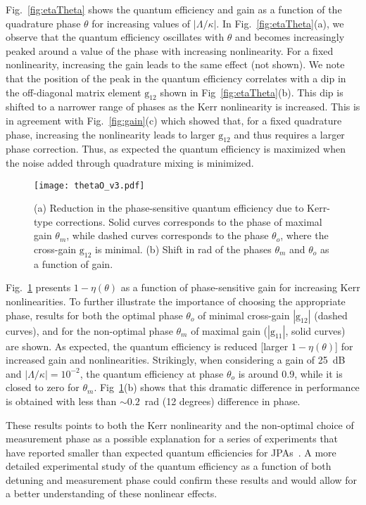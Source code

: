 \documentclass[pra,twocolumn,superscriptaddress]{revtex4-1}
\newcommand{\abs}[1]{\left|#1\right|}
\newcommand{\Grm}[0]{\mathrm{g}}
\begin{document}
Fig.~\ref{fig:etaTheta} shows the quantum efficiency and gain as a function of the quadrature phase $\theta$ for increasing values of $|\Lambda/\kappa|$. 
In Fig.~\ref{fig:etaTheta}(a), we observe that the quantum efficiency oscillates with $\theta$ and becomes increasingly peaked around a value of the phase with increasing nonlinearity. For a fixed nonlinearity, increasing the gain leads to the same effect (not shown).
We note that the position of the peak in the quantum efficiency correlates with a dip in the off-diagonal matrix element $\Grm_{12}$ shown in Fig~\ref{fig:etaTheta}(b). 
This dip is shifted to a narrower range of phases as the Kerr nonlinearity is increased. This is in agreement with Fig.~\ref{fig:gain}(c) which showed that, for a fixed quadrature phase, increasing the nonlinearity leads to larger $\Grm_{12}$ and thus requires a larger phase correction.
Thus, as expected the quantum efficiency is maximized when the noise added through quadrature mixing is minimized. 

\begin{figure}[tb]
	\texttt{[image: thetaO\_v3.pdf]}
	\caption{
		(a) Reduction in the phase-sensitive quantum efficiency due to Kerr-type corrections. Solid curves corresponds to the phase of maximal gain $\theta_m$, while dashed curves corresponds to the phase $\theta_o$, where the cross-gain $\Grm_{12}$ is minimal.
		(b) Shift in rad of the phases $\theta_m$ and $\theta_o$ as a function of gain. 
	}
	\label{fig:phaseSensitiveEta}
\end{figure}
% 
Fig.~\ref{fig:phaseSensitiveEta} presents $1-\eta(\theta)$ as a function of phase-sensitive gain for increasing Kerr nonlinearities. To further illustrate the importance of choosing the appropriate phase, results for both the optimal phase $\theta_o$ of minimal cross-gain $\abs{\Grm_{12}} $ (dashed curves), and for the non-optimal phase $\theta_m$ of maximal gain ($|\Grm_{11}|$, solid curves)  are shown. 
As expected, the quantum efficiency is reduced [larger $1-\eta(\theta)$] for increased gain and nonlinearities. 
Strikingly, when considering a gain of 25~dB and $|\Lambda/\kappa|=10^{-2}$, the quantum efficiency at phase $\theta_o$ is around 0.9, while it is closed to zero for $\theta_m$. Fig~\ref{fig:phaseSensitiveEta}(b) shows that this dramatic difference in performance is obtained with less than $\sim0.2$~rad (12 degrees) difference in phase.

These results points to both the Kerr nonlinearity and the non-optimal choice of measurement phase as a possible explanation for a series of experiments that have reported smaller than expected quantum efficiencies for JPAs~\cite{Murch:2013uq,Murch:2013kx,Vijay:2012uq,weberThesis}. A more detailed experimental study of the quantum efficiency as a function of both detuning and measurement phase could confirm these results and would allow for a better understanding of these nonlinear effects.
\end{document}
